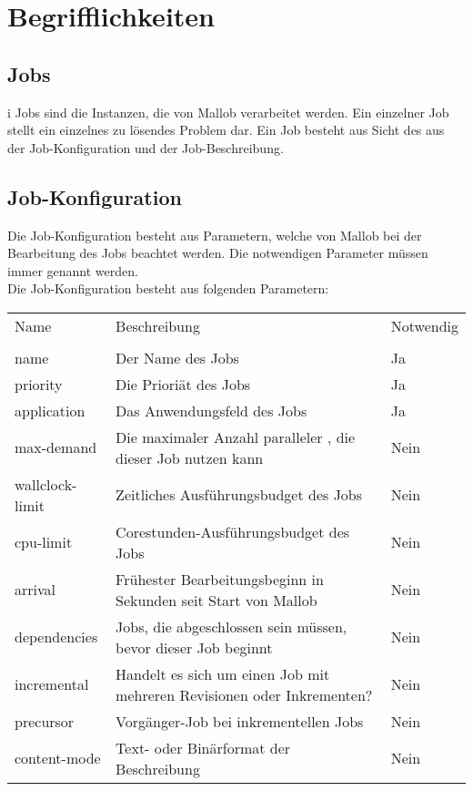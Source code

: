 \section{Begrifflichkeiten}

\subsection{Jobs}
\label{B:Jobs}
i
Jobs sind die Instanzen, die von \gls{Mallob} verarbeitet werden. Ein einzelner Job stellt ein einzelnes zu lösendes Problem dar. Ein Job besteht aus Sicht des  aus der Job-Konfiguration und der Job-Beschreibung.

\subsection{Job-Konfiguration}
\label{B:Job-Konfiguration}
Die Job-Konfiguration besteht aus Parametern, welche von \gls{Mallob} bei der Bearbeitung des Jobs beachtet werden. Die notwendigen Parameter müssen immer genannt werden.\\
Die Job-Konfiguration besteht aus folgenden Parametern: \\

\begin{tabular}{lL{0.6\textwidth}l}
        Name & Beschreibung & Notwendig\\
        \\
        name & Der Name des Jobs & Ja\\
        priority & Die Prioriät des Jobs & Ja\\
        application & Das Anwendungsfeld des Jobs & Ja\\ 
        max-demand & Die maximaler Anzahl paralleler , die dieser Job nutzen kann & Nein\\
        wallclock-limit & Zeitliches Ausführungsbudget des Jobs & Nein\\
        cpu-limit & Corestunden-Ausführungsbudget des Jobs & Nein\\
        arrival & Frühester Bearbeitungsbeginn in Sekunden seit Start von \gls{Mallob} & Nein\\
        dependencies & Jobs, die abgeschlossen sein müssen, bevor dieser Job beginnt & Nein\\
        incremental & Handelt es sich um einen Job mit mehreren Revisionen oder Inkrementen? &  Nein\\
        precursor & Vorgänger-Job bei inkrementellen Jobs & Nein\\
        content-mode & Text- oder Binärformat der Beschreibung & Nein\\
    \end{tabular} 
    
